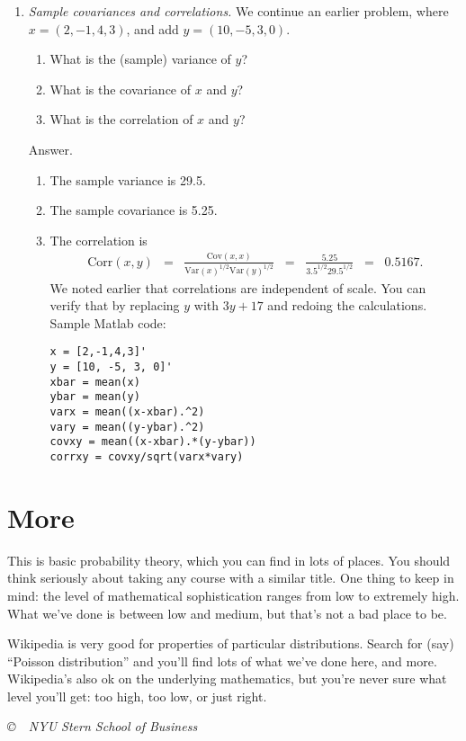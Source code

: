 \documentclass[11pt]{article}
\begin{document}
\begin{enumerate}
\item {\it Sample covariances and correlations.\/}
We continue an earlier problem, where $ x= (2,-1,4,3)$,
and add $y = (10,-5, 3, 0)$.
\begin{enumerate}
\item What is the (sample) variance of $y$?
\item What is the covariance of $x$ and $y$?
\item What is the correlation of $x$ and $y$?
\end{enumerate}

Answer.
\begin{enumerate}
\item The sample variance is 29.5.
\item The sample covariance is 5.25.
\item The correlation is
\begin{eqnarray*}
    \mbox{Corr}(x,y) &=&
            \frac {\mbox{Cov}(x,x)} {\mbox{Var}(x)^{1/2} \mbox{Var}(y)^{1/2} }
            \;\;=\;\; \frac{ 5.25} {3.5^{1/2} 29.5^{1/2}}
            \;\;=\;\; 0.5167 .
\end{eqnarray*}
We noted earlier that correlations are independent of scale.
You can verify that by replacing $y$ with $ 3y+17$ and redoing the calculations.
Sample Matlab code:
\begin{verbatim}
x = [2,-1,4,3]'
y = [10, -5, 3, 0]'
xbar = mean(x)
ybar = mean(y)
varx = mean((x-xbar).^2)
vary = mean((y-ybar).^2)
covxy = mean((x-xbar).*(y-ybar))
corrxy = covxy/sqrt(varx*vary)
\end{verbatim}
\end{enumerate}

\end{enumerate}


\section*{More}

This is basic probability theory, which you can find in lots of places.
You should think seriously about taking any course with a similar title.
One thing to keep in mind:
the level of mathematical sophistication ranges from low to extremely high.
What we've done is between low and medium, but that's not a bad place to be.

Wikipedia is very good for properties of particular distributions.
Search for (say) ``Poisson distribution'' and you'll find lots of what we've done here,
and more.
Wikipedia's also ok on the underlying mathematics, but you're never sure what
level you'll get:  too high, too low, or just right.


\vfill \centerline{\it \copyright \ \number\year \
NYU Stern School of Business}
\end{document}
